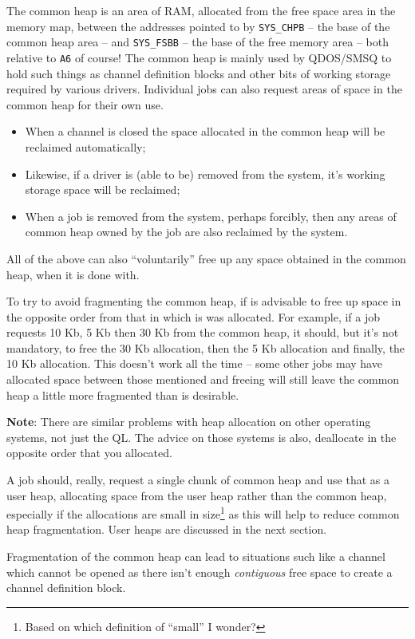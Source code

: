 The common heap is an area of RAM, allocated from the free space area
in the memory map, between the addresses pointed to by \texttt{SYS\_CHPB}
-- the base of the common heap area -- and \texttt{SYS\_FSBB} --
the base of the free memory area -- both relative to \texttt{A6}
of course! The common heap is mainly used by QDOS/SMSQ to hold such
things as channel definition blocks and other bits of working storage
required by various drivers. Individual jobs can also request areas
of space in the common heap for their own use.
\begin{itemize}
\item When a channel is closed the space allocated in the common heap will
be reclaimed automatically; 
\item Likewise, if a driver is (able to be) removed from the system, it's
working storage space will be reclaimed;
\item When a job is removed from the system, perhaps forcibly, then any
areas of common heap owned by the job are also reclaimed by the system.
\end{itemize}
All of the above can also ``voluntarily'' free up any space obtained
in the common heap, when it is done with.

To try to avoid fragmenting the common heap, if is advisable to free
up space in the opposite order from that in which is was allocated.
For example, if a job requests 10 Kb, 5 Kb then 30 Kb from the common
heap, it should, but it's not mandatory, to free the 30 Kb allocation,
then the 5 Kb allocation and finally, the 10 Kb allocation. This doesn't
work all the time -- some other jobs may have allocated space between
those mentioned and freeing will still leave the common heap a little
more fragmented than is desirable.

\textbf{Note}: There are similar problems with heap allocation on
other operating systems, not just the QL. The advice on those systems
is also, deallocate in the opposite order that you allocated.

A job should, really, request a single chunk of common heap and use
that as a user heap, allocating space from the user heap rather than
the common heap, especially if the allocations are small in size\footnote{Based on which definition of ``small'' I wonder?}
as this will help to reduce common heap fragmentation. User heaps
are discussed in the next section.

Fragmentation of the common heap can lead to situations such like
a channel which cannot be opened as there isn't enough \emph{contiguous}
free space to create a channel definition block. 

